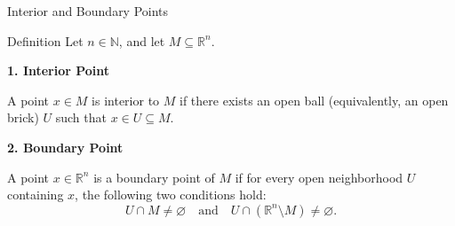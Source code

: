 \begin{frame}{Interior and Boundary Points}
\begin{block}{Definition}
    Let $n \in \mathbb{N}$, and let $M \subseteq \mathbb{R}^n$.

    \textbf{1. Interior Point}

    A point $x \in M$ is interior to $M$ if there exists an open ball (equivalently, an open brick) $U$ such that $x \in U \subseteq M$.

    \vspace{0.5em}

    \textbf{2. Boundary Point}

    A point $x \in \mathbb{R}^n$ is a boundary point of $M$ if for every open neighborhood $U$ containing $x$, the following two conditions hold:
    $$U \cap M \neq \varnothing \quad \text{and} \quad U \cap (\mathbb{R}^n \setminus M) \neq \varnothing.$$
\end{block}
\end{frame}

